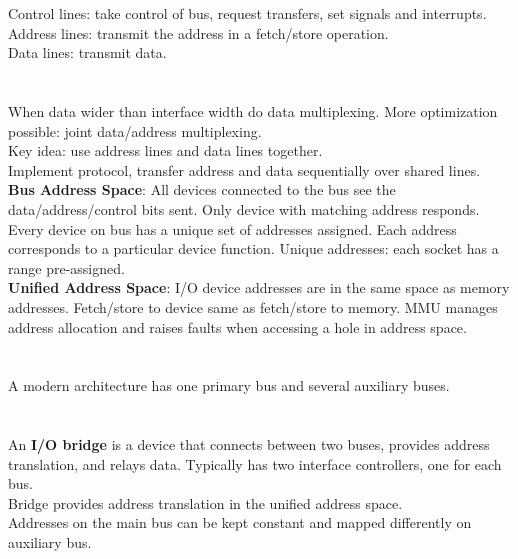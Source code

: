 \documentclass[letterpaper, 8pt]{extarticle}
\begin{document}
\begin{multicols*}{6}
	Control lines: take control of bus, request transfers, set signals and interrupts.\\
	Address lines: transmit the address in a fetch/store operation.\\
	Data lines: transmit data.\\~\\~\\
	When data wider than interface width do data multiplexing. More optimization possible: joint data/address multiplexing.\\
	Key idea: use address lines and data lines together.\\
	Implement protocol, transfer address and data sequentially over shared lines.\\
	\textbf{Bus Address Space}: All devices connected to the bus see the data/address/control bits sent. Only device with matching address responds. Every device on bus has a unique set of addresses assigned. Each address corresponds to a particular device function. Unique addresses: each socket has a range pre-assigned.\\
	\textbf{Unified Address Space}: I/O device addresses are in the same space as memory addresses. Fetch/store to device same as fetch/store to memory. MMU manages address allocation and raises faults when accessing a hole in address space.\\~\\~\\
	A modern architecture has one primary bus and several auxiliary buses.\\~\\~\\
	An \textbf{I/O bridge} is a device that connects between two buses, provides address translation, and relays data. Typically has two interface controllers, one for each bus.\\
	Bridge provides address translation in the unified address space.\\
	Addresses on the main bus can be kept constant and mapped differently on auxiliary bus.\\


\end{multicols*}
\end{document}
